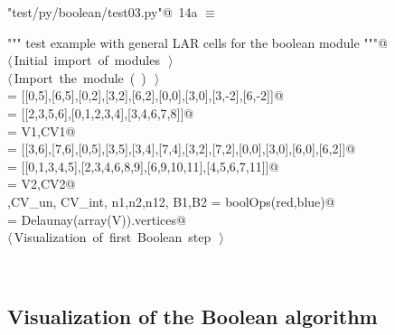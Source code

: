 \documentclass[11pt,oneside]{article}	%
\begin{document}
\begin{flushleft} \small
\begin{minipage}{\linewidth} \label{scrap24}
\protect{}\verb@"test/py/boolean/test03.py"@\nobreak\ {\footnotesize 14a }$\equiv$
\vspace{-1ex}
\begin{list}{}{} \item
\mbox{}\verb@""" test example with general LAR cells for the boolean module """@\\
\mbox{}\verb@@\hbox{$\langle\,$Initial import of modules\nobreak\ {\footnotesize {}}$\,\rangle$}\verb@@\\
\mbox{}\verb@@\hbox{$\langle\,$Import the module\nobreak\ ({\footnotesize {}\label{scrap25}
 }\mbox{}\verb@boolean@ ) {\footnotesize {}}$\,\rangle$}\verb@@\\
\mbox{} = [[0,5],[6,5],[0,2],[3,2],[6,2],[0,0],[3,0],[3,-2],[6,-2]]@\\
\mbox{} = [[2,3,5,6],[0,1,2,3,4],[3,4,6,7,8]]@\\
\mbox{}\verb@blue = V1,CV1@\\
\mbox{} = [[3,6],[7,6],[0,5],[3,5],[3,4],[7,4],[3,2],[7,2],[0,0],[3,0],[6,0],[6,2]]@\\
\mbox{} = [[0,1,3,4,5],[2,3,4,6,8,9],[6,9,10,11],[4,5,6,7,11]]@\\
\mbox{}\verb@red = V2,CV2@\\
\mbox{}\verb@V,CV_un, CV_int, n1,n2,n12, B1,B2 = boolOps(red,blue)@\\
\mbox{}\verb@CV = Delaunay(array(V)).vertices@\\
\mbox{}\verb@@\hbox{$\langle\,$Visualization of first Boolean step\nobreak\ {\footnotesize {}}$\,\rangle$}\verb@@\\
\mbox{}\verb@@{\NWsep}
\end{list}
\vspace{-2ex}
\end{minipage}\\[4ex]
\end{flushleft}

\subsection{Visualization of the Boolean algorithm}
\end{document}
